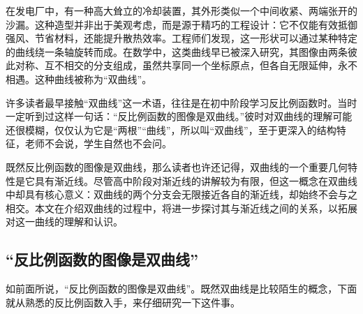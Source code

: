 
\begin{issues}
\issueDraft
\end{issues}


在发电厂中，有一种高大耸立的冷却装置，其外形类似一个中间收紧、两端张开的沙漏。这种造型并非出于美观考虑，而是源于精巧的工程设计：它不仅能有效抵御强风、节省材料，还能提升散热效率。工程师们发现，这一形状可以通过某种特定的曲线绕一条轴旋转而成。在数学中，这类曲线早已被深入研究，其图像由两条彼此对称、互不相交的分支组成，虽然共享同一个坐标原点，但各自无限延伸，永不相遇。这种曲线被称为“双曲线”。

许多读者最早接触“双曲线”这一术语，往往是在初中阶段学习反比例函数时。当时一定听到过这样一句话：“反比例函数的图像是双曲线。”彼时对双曲线的理解可能还很模糊，仅仅认为它是“两根”“曲线”，所以叫“双曲线”，至于更深入的结构特征，老师不会说，学生自然也不会问。

既然反比例函数的图像是双曲线，那么读者也许还记得，双曲线的一个重要几何特性是它具有渐近线。尽管高中阶段对渐近线的讲解较为有限，但这一概念在双曲线中却具有核心意义：双曲线的两个分支会无限接近各自的渐近线，却始终不会与之相交。本文在介绍双曲线的过程中，将进一步探讨其与渐近线之间的关系，以拓展对这一曲线的理解和认识。

\subsection{“反比例函数的图像是双曲线”}

如前面所说，“反比例函数的图像是双曲线”。既然双曲线是比较陌生的概念，下面就从熟悉的反比例函数入手，来仔细研究一下这件事。

